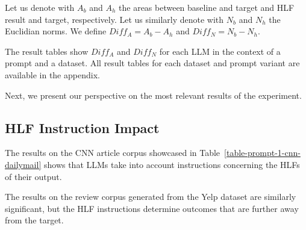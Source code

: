\documentclass[11pt]{article}
\begin{document}
Let us denote with $A_b$ and $A_h$ the areas between baseline and target and HLF
result and target, respectively.
Let us similarly denote with $N_b$ and $N_h$ the Euclidian norms.
We define $Diff_A = A_b - A_h$ and $Diff_N = N_b - N_h$.

The result tables show $Diff_A$ and $Diff_N$ for each LLM in the context of a
prompt and a dataset.
All result tables for each dataset and prompt variant are available in the
appendix.

Next, we present our perspective on the most relevant results of the experiment.

\subsection{HLF Instruction Impact}

The results on the CNN article corpus showcased in Table~\ref{table-prompt-1-cnn-dailymail}
shows that LLMs take into account instructions concerning the HLFs of their
output.

The results on the review corpus generated from the Yelp dataset are similarly
significant, but the HLF instructions determine outcomes that are further away
from the target.
\end{document}
